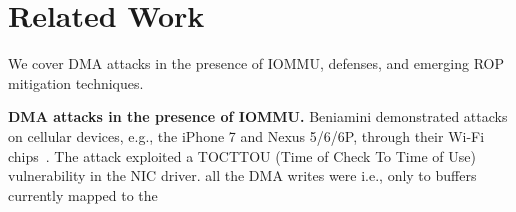 \section{Related Work}
We cover DMA attacks in the presence of IOMMU, defenses, and emerging ROP mitigation techniques.

\smallskip
\noindent\textbf{DMA attacks in the presence of IOMMU.}
Beniamini demonstrated attacks on cellular devices, e.g., the iPhone 7 and Nexus 5/6/6P, through their Wi-Fi chips~\cite{Ben17a, Ben17b}. 
The attack exploited a TOCTTOU (Time of Check To Time of Use) vulnerability in the NIC driver. \DIFdelbegin {}\DIFdelend \DIFaddbegin {}\simple {}\DIFaddend all the DMA writes were \DIFdelbegin {}\DIFdelend \DIFaddbegin {}\DIFaddend i.e., only to buffers currently mapped to the \DIFdelbegin {}\DIFdelend \DIFaddbegin {}

